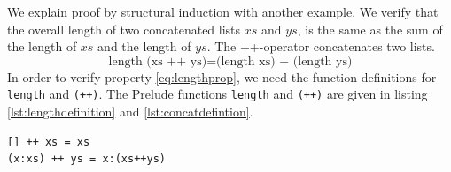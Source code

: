 We explain proof by structural induction with another example. We verify that the overall length of two concatenated lists $xs$ and $ys$, is the same as the sum of the length of $xs$ and the length of $ys$.  The ++-operator concatenates two lists.
\begin{equation}
  \label{eq:lengthprop}
  \text{length (xs ++ ys)} = \text{(length xs) + (length ys)}
\end{equation}
In order to verify property \ref{eq:lengthprop}, we need the function definitions for \verb|length| and \verb|(++)|.
The Prelude functions \verb|length| and \verb|(++)| are given in listing \ref{lst:lengthdefinition} and \ref{lst:concatdefintion}.

\begin{lstlisting}[caption={Haskell function defintion of the concatenation operator},label={lst:concatdefintion}]
[] ++ xs = xs
(x:xs) ++ ys = x:(xs++ys)
\end{lstlisting}


